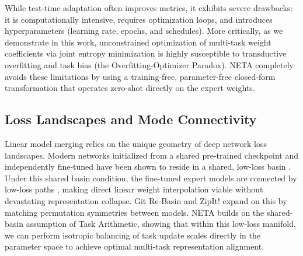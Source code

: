 While test-time adaptation often improves metrics, it exhibits severe drawbacks: it is computationally intensive, requires optimization loops, and introduces hyperparameters (learning rate, epochs, and schedules). More critically, as we demonstrate in this work, unconstrained optimization of multi-task weight coefficients via joint entropy minimization is highly susceptible to transductive overfitting and task bias (the Overfitting-Optimizer Paradox). NETA completely avoids these limitations by using a training-free, parameter-free closed-form transformation that operates zero-shot directly on the expert weights.

\subsection{Loss Landscapes and Mode Connectivity}
Linear model merging relies on the unique geometry of deep network loss landscapes. Modern networks initialized from a shared pre-trained checkpoint and independently fine-tuned have been shown to reside in a shared, low-loss basin \cite{neyshabur2020what, wortsman2022model}. Under this shared basin condition, the fine-tuned expert models are connected by low-loss paths \cite{garipov2018mode, draxler2018essentially}, making direct linear weight interpolation viable without devastating representation collapse. Git Re-Basin \cite{ainsworth2023git} and ZipIt! \cite{stoica2023zipit} expand on this by matching permutation symmetries between models. NETA builds on the shared-basin assumption of Task Arithmetic, showing that within this low-loss manifold, we can perform isotropic balancing of task update scales directly in the parameter space to achieve optimal multi-task representation alignment.
